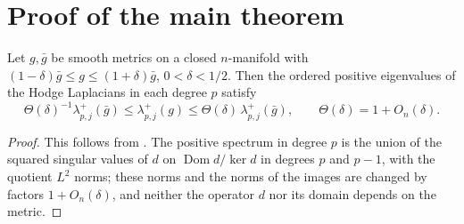 \section{Proof of the main theorem}\label{sec:proof}

\begin{lemma}[Dodziuk]\label{lem:dodziuk}
Let $g,\bar g$ be smooth metrics on a closed $n$-manifold with
$(1-\delta)\bar g\le g\le(1+\delta)\bar g$, $0<\delta<1/2$. Then the
ordered positive eigenvalues of the Hodge Laplacians in each degree $p$
satisfy
\[
 \Theta(\delta)^{-1}\lambda^+_{p,j}(\bar g)\le\lambda^+_{p,j}(g)
 \le\Theta(\delta)\,\lambda^+_{p,j}(\bar g),\qquad
 \Theta(\delta)=1+O_n(\delta).
\]
\end{lemma}
\begin{proof}
This follows from \cite[Proposition~3.3]{dodziuk}. The positive spectrum in degree
$p$ is the union of the squared singular values of $d$ on
$\operatorname{Dom}d/\ker d$ in degrees $p$ and $p-1$, with the quotient
$L^2$ norms; these norms and the norms of the images are changed by
factors $1+O_n(\delta)$, and neither the operator $d$ nor its domain
depends on the metric.
\end{proof}


